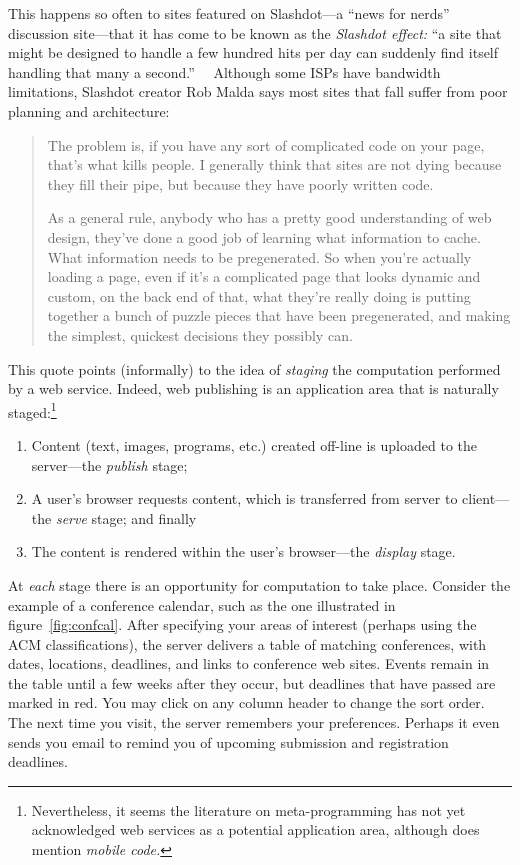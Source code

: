 \documentclass[preprint]{acm_proc_article-sp}
\begin{document}
This happens so often to sites featured on Slashdot---a
``news for nerds'' discussion site---that it has come to be
known as the \emph{Slashdot effect:} ``a site that might be
designed to handle a few hundred hits per day can suddenly
find itself handling that many a
second.''~\cite{turner03slashdot}~ Although some ISPs have
bandwidth limitations, Slashdot creator Rob Malda says most
sites that fall suffer from poor planning and architecture:
\begin{quote}
  The problem is, if you have any sort of complicated code
  on your page, that’s what kills people. I generally think
  that sites are not dying because they fill their pipe, but
  because they have poorly written code.
  
  As a general rule, anybody who has a pretty good
  understanding of web design, they’ve done a good job of
  learning what information to cache. What information needs
  to be pregenerated. So when you’re actually loading a
  page, even if it’s a complicated page that looks dynamic
  and custom, on the back end of that, what they’re really
  doing is putting together a bunch of puzzle pieces that
  have been pregenerated, and making the simplest, quickest
  decisions they possibly can.~\cite{turner03slashdot}
\end{quote}

This quote points (informally) to the idea of \emph{staging} the
computation performed by a web service.  Indeed, web publishing is an
application area that is naturally staged:\footnote{Nevertheless, it
  seems the literature on meta-programming has not yet acknowledged
  web services as a potential application area, although
  \citet{sheard01accomp} does
  mention \emph{mobile code.}} %
\begin{enumerate}
\item Content (text, images, programs, etc.) created
  off-line is uploaded to the server---the \emph{publish}
  stage;
  
\item A user's browser requests content, which is
  transferred from server to client---the \emph{serve}
  stage; and finally
  
\item The content is rendered within the user's
  browser---the \emph{display} stage.
\end{enumerate}
At \emph{each} stage there is an opportunity for computation
to take place.  Consider the example of a conference
calendar, such as the one illustrated in
figure~\ref{fig:confcal}.  After specifying your areas of
interest (perhaps using the ACM classifications), the server
delivers a table of matching conferences, with dates,
locations, deadlines, and links to conference web sites.
Events remain in the table until a few weeks after they
occur, but deadlines that have passed are marked in red.
You may click on any column header to change the sort order.
The next time you visit, the server remembers your
preferences.  Perhaps it even sends you email to remind you
of upcoming submission and registration deadlines.
\end{document}
